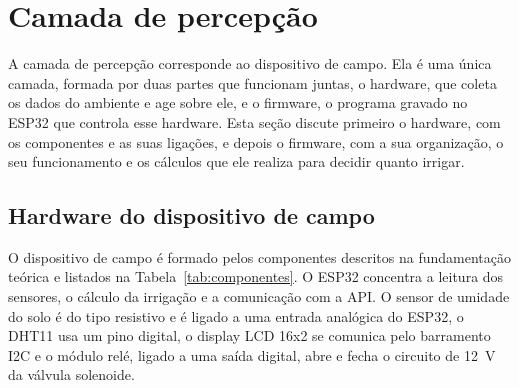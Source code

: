\section{Camada de percepção}
\label{sec:percepcao}

A camada de percepção corresponde ao dispositivo de campo. Ela é uma única camada, formada por duas partes que funcionam juntas, o hardware, que coleta os dados do ambiente e age sobre ele, e o firmware, o programa gravado no ESP32 que controla esse hardware. Esta seção discute primeiro o hardware, com os componentes e as suas ligações, e depois o firmware, com a sua organização, o seu funcionamento e os cálculos que ele realiza para decidir quanto irrigar.

\subsection{Hardware do dispositivo de campo}
\label{sec:hardware}

O dispositivo de campo é formado pelos componentes descritos na fundamentação teórica e listados na Tabela~\ref{tab:componentes}. O ESP32 concentra a leitura dos sensores, o cálculo da irrigação e a comunicação com a API. O sensor de umidade do solo é do tipo resistivo e é ligado a uma entrada analógica do ESP32, o DHT11 usa um pino digital, o display LCD 16x2 se comunica pelo barramento I2C e o módulo relé, ligado a uma saída digital, abre e fecha o circuito de 12~V da válvula solenoide.

